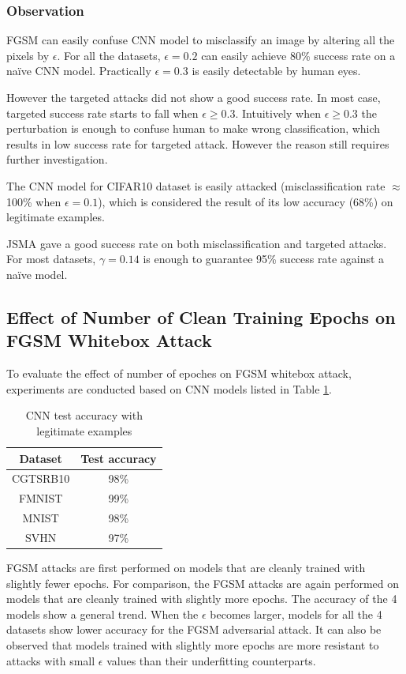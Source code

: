 \documentclass{article}
\begin{document}
\subsubsection{Observation}

FGSM can easily confuse CNN model to misclassify an image by altering all the pixels by \(\epsilon\).
For all the datasets, \(\epsilon=0.2\) can easily achieve 80\% success rate on a na\"ive CNN model.
Practically \(\epsilon=0.3\) is easily detectable by human eyes.

However the targeted attacks did not show a good success rate. In most case, targeted success rate starts to fall when \(\epsilon\geq 0.3\).
Intuitively when \(\epsilon\geq 0.3\) the perturbation is enough to confuse human to make wrong classification,
which results in low success rate for targeted attack. However the reason still requires further investigation.

The CNN model for CIFAR10 dataset is easily attacked (misclassification rate $\approx$ 100\% when \(\epsilon=0.1\)),
which is considered the result of its low accuracy (68\%) on legitimate examples.

JSMA gave a good success rate on both misclassification and targeted attacks.
For most datasets, \(\gamma=0.14\) is enough to guarantee 95\% success rate against a na\"ive model.


\subsection{Effect of Number of Clean Training Epochs on FGSM Whitebox Attack}

To evaluate the effect of number of epoches on FGSM whitebox attack, experiments are conducted based on CNN models listed in Table \ref{tab:cnnaccuracy2}.

\begin{table}
\centering
\begin{tabular}{cc}
    \toprule
    Dataset & Test accuracy \\
    \midrule
    CGTSRB10 & 98\% \\
    FMNIST & 99\% \\
    MNIST & 98\%  \\
    SVHN & 97\% \\
    \bottomrule
\end{tabular}
\caption{\label{tab:cnnaccuracy2} CNN test accuracy with legitimate examples}
\end{table}

FGSM attacks are first performed on models that are cleanly trained with slightly fewer epochs.
For comparison, the FGSM attacks are again performed on models that are cleanly trained with slightly more epochs.
The accuracy of the 4 models show a general trend.
When the $\epsilon$ becomes larger, models for all the 4 datasets show lower accuracy for the FGSM adversarial attack.
It can also be observed that models trained with slightly more epochs are more resistant to attacks with small $\epsilon$ values than their underfitting counterparts.
\end{document}
